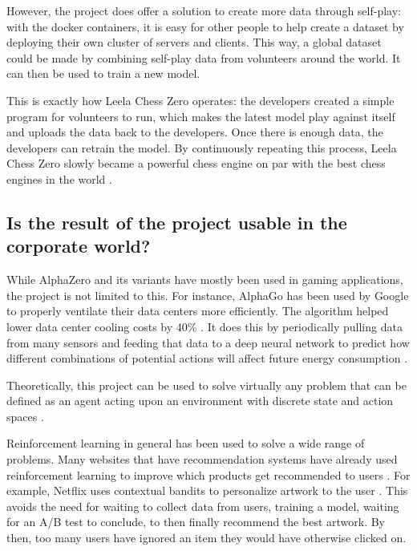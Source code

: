 \documentclass{article}
\begin{document}
However, the project does offer a solution to create more data through self-play: with the docker containers, 
it is easy for other people to help create a dataset by deploying their own cluster of servers and clients. 
This way, a global dataset could be made by combining self-play data from volunteers around the world. 
It can then be used to train a new model. 

This is exactly how Leela Chess Zero operates: the developers created a simple program for volunteers to run,
which makes the latest model play against itself and uploads the data back to the developers. Once there is
enough data, the developers can retrain the model. By continuously repeating this process, Leela Chess Zero
slowly became a powerful chess engine on par with the best chess engines in the world \cite{TopChessEngine2022}.

\subsection{Is the result of the project usable in the corporate world?}

While AlphaZero and its variants have mostly been used in gaming applications, 
the project is not limited to this. For instance, AlphaGo has been used by Google
to properly ventilate their data centers more efficiently. The algorithm helped lower
data center cooling costs by 40\% \cite{decemberHasGoogleCracked2020}. 
It does this by periodically pulling data from many sensors and feeding that data to 
a deep neural network to predict how different combinations of potential actions
will affect future energy consumption \cite{HowAIHelps2018}.

Theoretically, this project can be used to solve virtually any problem that can be
defined as an agent acting upon an environment with discrete state and action spaces \cite{ReinforcementLearning2022a}.

Reinforcement learning in general has been used to solve a wide range of problems.
Many websites that have recommendation systems have already used reinforcement learning 
to improve which products get recommended to users \cite{nbroAnswerAreThere2020}. 
For example, Netflix uses contextual bandits to personalize artwork to the user \cite{blogArtworkPersonalizationNetflix2017,surmenokContextualBanditsReinforcement2017}.
This avoids the need for waiting to collect data from users, training a model,
waiting for an A/B test to conclude, to then finally recommend the best artwork.
By then, too many users have ignored an item they would have otherwise clicked on.
\end{document}
